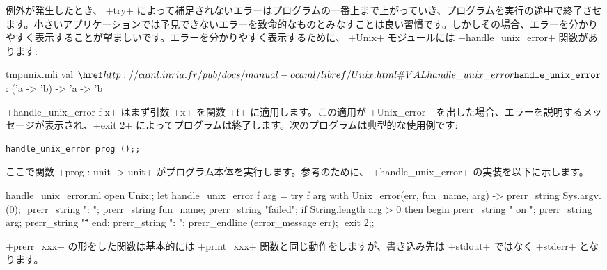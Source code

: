 例外が発生したとき、 \ml+try+ によって補足されないエラーはプログラムの一番上まで上がっていき、プログラムを実行の途中で終了させます。小さいアプリケーションでは予見できないエラーを致命的なものとみなすことは良い習慣です。しかしその場合、エラーを分かりやすく表示することが望ましいです。エラーを分かりやすく表示するために、 \ml+Unix+ モジュールには \ml+handle_unix_error+ 関数があります:
%
\begin{listingcodefile}{tmpunix.mli}
val $\indexlibvalue{Unix}{handle\_unix\_error}$ : ('a -> 'b) -> 'a -> 'b
\end{listingcodefile}
%
\ml+handle_unix_error f x+ はまず引数 \ml+x+ を関数 \ml+f+ に適用します。この適用が \ml+Unix_error+ を出した場合、エラーを説明するメッセージが表示され、\ml+exit 2+ によってプログラムは終了します。次のプログラムは典型的な使用例です:
%
\begin{lstlisting}
handle_unix_error prog ();;
\end{lstlisting}
%
ここで関数 \ml+prog : unit -> unit+ がプログラム本体を実行します。参考のために、 \ml+handle_unix_error+ の実装を以下に示します。
%
\begin{listingcodefile}[style=numbers]{handle_unix_error.ml}
open Unix;;
let handle_unix_error f arg =
  try
    f arg
  with Unix_error(err, fun_name, arg) ->
    prerr_string Sys.argv.(0); $\label{prog:argv}$
    prerr_string ": \"";
    prerr_string fun_name;
    prerr_string "\" failed";
    if String.length arg > 0 then begin
      prerr_string " on \"";
      prerr_string arg;
      prerr_string "\""
    end;
    prerr_string ": ";
    prerr_endline (error_message err); $\label{prog:errmsg}$
    exit 2;;
\end{listingcodefile}
%
\ml+prerr_xxx+ の形をした関数は基本的には \ml+print_xxx+ 関数と同じ動作をしますが、書き込み先は \ml+stdout+ ではなく \ml+stderr+ となります。

